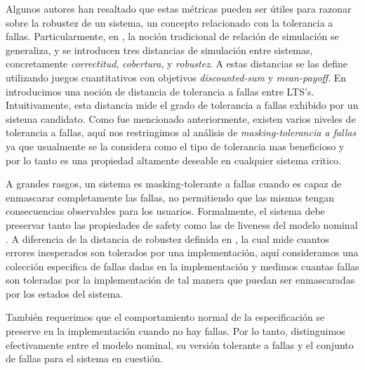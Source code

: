 Algunos autores han resaltado que estas métricas pueden ser útiles para razonar sobre la robustez de un sistema, un concepto relacionado con la tolerancia a fallas. Particularmente, en \cite{CernyHR12}, la noción tradicional de relación de simulación se generaliza, y se introducen tres distancias de simulación entre sistemas, concretamente \emph{correctitud}, \emph{cobertura}, y \emph{robustez}.
A estas distancias se las define utilizando juegos cuantitativos con objetivos \emph{discounted-sum} y \emph{mean-payoff}.
En \cite{CastroDDP18b} introducimos una noción de distancia de tolerancia a fallas entre LTS's. Intuitivamente, esta distancia mide el grado de tolerancia a fallas exhibido por un sistema candidato. Como fue mencionado anteriormente, existen varios niveles de tolerancia a fallas, aquí nos restringimos al análisis de \emph{masking-tolerancia a fallas} ya que usualmente se la considera como el tipo de tolerancia mas beneficioso y por lo tanto es una propiedad altamente deseable en cualquier sistema critico.

A grandes rasgos, un sistema es masking-tolerante a fallas cuando es capaz de enmascarar completamente las fallas, no permitiendo que las mismas tengan consecuencias observables para los usuarios. Formalmente, el sistema debe preservar tanto las propiedades de safety como las de liveness del modelo nominal \cite{Gartner99}. A diferencia de la distancia de robustez definida en \cite{CernyHR12}, la cual mide cuantos errores inesperados son tolerados por una implementación, aquí consideramos una colección especifica de fallas dadas en la implementación y medimos cuantas fallas son toleradas por la implementación de tal manera que puedan ser enmascaradas por los estados del sistema.

También requerimos que el comportamiento normal de la especificación se preserve en la implementación cuando no hay fallas.
Por lo tanto, distinguimos efectivamente entre el modelo nominal, su versión tolerante a fallas  y el conjunto de fallas para el sistema en cuestión.

